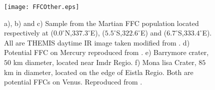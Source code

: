 \begin{figure}[htpb]
  \begin{center}
    \graphicspath{ {/Users/thorey/Documents/These/Manuscript/Figure/Chapter7/} }
    \texttt{[image: FFCOther.eps]}
    \caption{a),  b) and  c) Sample  from the  Martian FFC  population
      located  respectively  at ($0.0^{\circ}$N,$337.3  ^{\circ}  $E),
      ($5.5^{\circ}$S,$322.6         ^{\circ}          $E)         and
      ($6.7^{\circ}$S,$333.4^{\circ}$E).   All are  THEMIS daytime  IR
      image taken modified from  \citet{Sato:2010ex}. d) Potential FFC
      on Mercury reproduced  from \citet{Schultz:1977ec}. e) Barrymore
      crater, $50$ km diameter, located  near Imdr Regio. f) Mona lisa
      Crater,  $85$ km  in diameter,  located  on the  edge of  Eistla
      Regio.   Both  are potential  FFCs  on  Venus.  Reproduced  from
      \citet{Wichman:1995ju}.}
    \label{C7-FFCOther}
  \end{center}
\end{figure}

